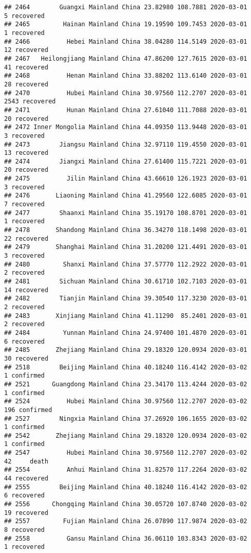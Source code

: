 \documentclass[
]{article}
\begin{document}
\begin{verbatim}
## 2464        Guangxi Mainland China 23.82980 108.7881 2020-03-01     5 recovered
## 2465         Hainan Mainland China 19.19590 109.7453 2020-03-01     1 recovered
## 2466          Hebei Mainland China 38.04280 114.5149 2020-03-01    12 recovered
## 2467   Heilongjiang Mainland China 47.86200 127.7615 2020-03-01    41 recovered
## 2468          Henan Mainland China 33.88202 113.6140 2020-03-01    28 recovered
## 2470          Hubei Mainland China 30.97560 112.2707 2020-03-01  2543 recovered
## 2471          Hunan Mainland China 27.61040 111.7088 2020-03-01    20 recovered
## 2472 Inner Mongolia Mainland China 44.09350 113.9448 2020-03-01     3 recovered
## 2473        Jiangsu Mainland China 32.97110 119.4550 2020-03-01    13 recovered
## 2474        Jiangxi Mainland China 27.61400 115.7221 2020-03-01    20 recovered
## 2475          Jilin Mainland China 43.66610 126.1923 2020-03-01     3 recovered
## 2476       Liaoning Mainland China 41.29560 122.6085 2020-03-01     7 recovered
## 2477        Shaanxi Mainland China 35.19170 108.8701 2020-03-01     1 recovered
## 2478       Shandong Mainland China 36.34270 118.1498 2020-03-01    22 recovered
## 2479       Shanghai Mainland China 31.20200 121.4491 2020-03-01     3 recovered
## 2480         Shanxi Mainland China 37.57770 112.2922 2020-03-01     2 recovered
## 2481        Sichuan Mainland China 30.61710 102.7103 2020-03-01    14 recovered
## 2482        Tianjin Mainland China 39.30540 117.3230 2020-03-01     2 recovered
## 2483       Xinjiang Mainland China 41.11290  85.2401 2020-03-01     2 recovered
## 2484         Yunnan Mainland China 24.97400 101.4870 2020-03-01     6 recovered
## 2485       Zhejiang Mainland China 29.18320 120.0934 2020-03-01    30 recovered
## 2518        Beijing Mainland China 40.18240 116.4142 2020-03-02     1 confirmed
## 2521      Guangdong Mainland China 23.34170 113.4244 2020-03-02     1 confirmed
## 2524          Hubei Mainland China 30.97560 112.2707 2020-03-02   196 confirmed
## 2527        Ningxia Mainland China 37.26920 106.1655 2020-03-02     1 confirmed
## 2542       Zhejiang Mainland China 29.18320 120.0934 2020-03-02     1 confirmed
## 2547          Hubei Mainland China 30.97560 112.2707 2020-03-02    42     death
## 2554          Anhui Mainland China 31.82570 117.2264 2020-03-02    44 recovered
## 2555        Beijing Mainland China 40.18240 116.4142 2020-03-02     6 recovered
## 2556      Chongqing Mainland China 30.05720 107.8740 2020-03-02    19 recovered
## 2557         Fujian Mainland China 26.07890 117.9874 2020-03-02     8 recovered
## 2558          Gansu Mainland China 36.06110 103.8343 2020-03-02     1 recovered

\end{verbatim}
\end{document}
